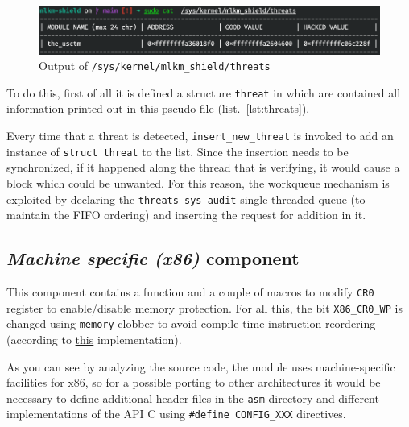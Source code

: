 \documentclass{article}
\begin{document}
	\begin{figure}[!htbp]
		\centering
		\includegraphics[scale=0.4]{threats}
		\caption{Output of \texttt{/sys/kernel/mlkm\_shield/threats}}
		\label{fig:threats}
	\end{figure}

	To do this, first of all it is defined a structure \texttt{threat} in which are contained all information printed
	out in this pseudo-file (list.~\ref{lst:threats}).

	Every time that a threat is detected, \texttt{insert\_new\_threat} is invoked to add an instance of \texttt{struct
	threat} to the list. Since the insertion needs to be synchronized, if it happened along the thread that is
	verifying, it would cause a block which could be unwanted. For this reason, the workqueue mechanism is exploited by
	declaring the \texttt{threats-sys-audit} single-threaded queue (to maintain the FIFO ordering) and inserting the
	request for addition in it.

	\subsection{\emph{Machine specific (x86)} component}\label{sec:x86}
	This component contains a function and a couple of macros to modify \texttt{CR0} register to enable/disable
	memory protection. For all this, the bit \texttt{X86\_CR0\_WP} is changed using \texttt{memory} clobber to avoid
	compile-time instruction reordering (according to
	\href{https://elixir.bootlin.com/linux/v5.17.3/source/arch/x86/include/asm/special_insns.h#L54}{this}
	implementation).

	As you can see by analyzing the source code, the module uses machine-specific facilities for x86, so for a possible
	porting to other architectures it would be necessary to define additional header files in the \texttt{asm}
	directory and different implementations of the API C using \texttt{\#define CONFIG\_XXX} directives.
\end{document}
